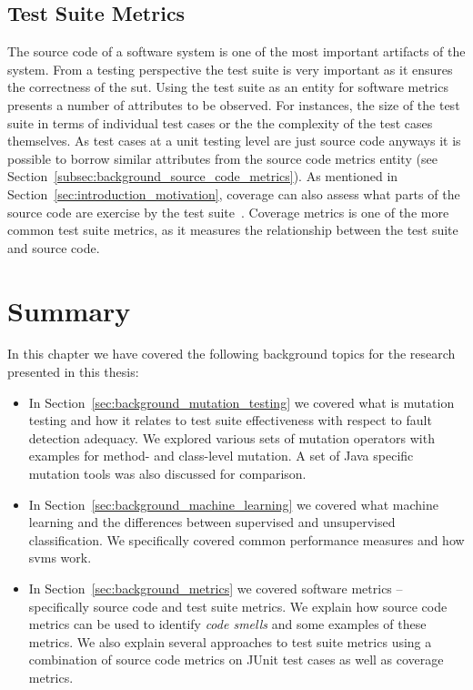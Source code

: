 \subsection{Test Suite Metrics}
\label{subsec:background_test_suite_metrics}
The source code of a software system is one of the most important artifacts of the system. From a testing perspective the test suite is very important as it ensures the correctness of the \gls{sut}. Using the test suite as an entity for software metrics presents a number of attributes to be observed. For instances, the size of the test suite in terms of individual test cases or the the complexity of the test cases themselves. As test cases at a unit testing level are just source code anyways it is possible to borrow similar attributes from the source code metrics entity (see Section~\ref{subsec:background_source_code_metrics}). As mentioned in Section~\ref{sec:introduction_motivation}, coverage can also assess what parts of the source code are exercise by the test suite~\cite{ZHM97}. Coverage metrics is one of the more common test suite metrics, as it measures the relationship between the test suite and source code.


\section{Summary}
\label{sec:background_summary}
In this chapter we have covered the following background topics for the research presented in this thesis:

\begin{itemize}
  \item In Section~\ref{sec:background_mutation_testing} we covered what is mutation testing and how it relates to test suite effectiveness with respect to fault detection adequacy. We explored various sets of mutation operators with examples for method- and class-level mutation. A set of Java specific mutation tools was also discussed  for comparison.
  \item In Section~\ref{sec:background_machine_learning} we covered what machine learning and the differences between supervised and unsupervised classification. We specifically covered common performance measures and how \gls{svm}s work.
  \item In Section~\ref{sec:background_metrics} we covered software metrics -- specifically source code and test suite metrics. We explain how source code metrics can be used to identify \emph{code smells} and some examples of these metrics. We also explain several approaches to test suite metrics using a combination of source code metrics on JUnit test cases as well as coverage metrics.
\end{itemize}
